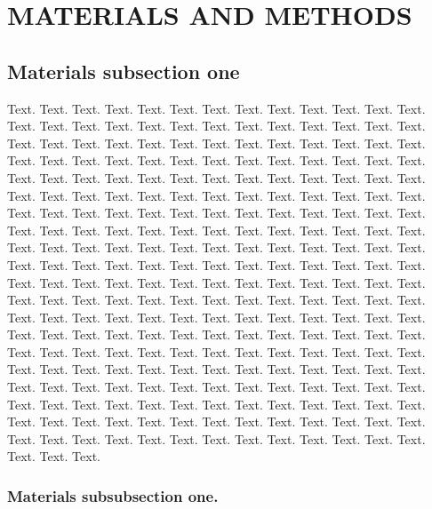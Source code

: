 \documentclass[a4,center,fleqn]{NAR}
\begin{document}
\section{MATERIALS AND METHODS}

\subsection{Materials subsection one}

Text. Text. Text. Text. Text. Text. Text. Text. Text. Text. Text.
Text. Text. Text. Text. Text. Text. Text. Text. Text. Text. Text.
Text. Text. Text. Text. Text. Text. Text. Text. Text. Text. Text.
Text. Text. Text. Text. Text. Text. Text. Text. Text. Text. Text.
Text. Text. Text. Text. Text. Text. Text. Text. Text. Text. Text.
Text. Text. Text. Text. Text. Text. Text. Text. Text. Text. Text.
Text. Text. Text. Text. Text. Text. Text. Text. Text. Text. Text.
Text. Text. Text. Text. Text. Text. Text. Text. Text. Text. Text.
Text. Text. Text. Text. Text. Text. Text. Text. Text. Text. Text.
Text. Text. Text. Text. Text. Text. Text. Text. Text. Text. Text.
Text. Text. Text. Text. Text. Text. Text. Text. Text. Text. Text.
Text. Text. Text. Text. Text. Text. Text. Text. Text. Text. Text.
Text. Text. Text. Text. Text. Text. Text. Text. Text. Text. Text.
Text. Text. Text. Text. Text. Text. Text. Text. Text. Text. Text.
Text. Text. Text. Text. Text. Text. Text. Text. Text. Text. Text.
Text. Text. Text. Text. Text. Text. Text. Text. Text. Text. Text.
Text. Text. Text. Text. Text. Text. Text. Text. Text. Text. Text.
Text. Text. Text. Text. Text. Text. Text. Text. Text. Text. Text.
Text. Text. Text. Text. Text. Text. Text. Text. Text. Text. Text.
Text. Text. Text. Text. Text. Text. Text. Text. Text. Text. Text.
Text. Text. Text. Text. Text. Text. Text. Text. Text. Text. Text.
Text. Text. Text. Text. Text. Text. Text. Text. Text. Text. Text.
Text. Text. Text. Text. Text. Text. Text. Text. Text. Text. Text.
Text. Text. Text. Text. Text. Text. Text. Text. Text. Text.


\subsubsection{Materials subsubsection one.}
\end{document}
